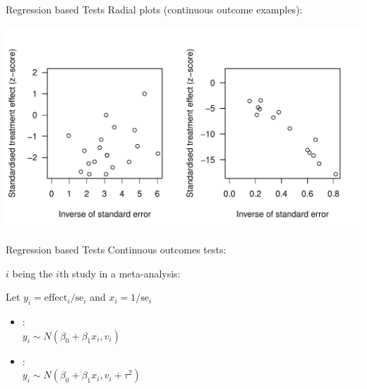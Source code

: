 \documentclass[english]{beamer}\usepackage[]{graphicx}\usepackage[]{color}
\makeatletter
\def\maxwidth{ %
  \ifdim\Gin@nat@width>\linewidth
    \linewidth
  \else
    \Gin@nat@width
  \fi
}
\newenvironment{knitrout}{}{} %
\makeatother
\begin{document}
\begin{frame}[fragile]{Regression based Tests}
Radial plots (continuous outcome examples):

\vspace{-1.2cm}

\begin{knitrout}
\color{fgcolor}
\includegraphics[width=\maxwidth]{figure/unnamed-chunk-7-1} 

\end{knitrout}

\end{frame}


\begin{frame}{Regression based Tests}
Continuous outcomes tests:

$i$ being the $i$th study in a meta-analysis:

Let $y_{i} = \textrm{effect}_{i}/\textrm{se}_{i}$ and $x_{i} = 1/\textrm{se}_{i}$
\begin{itemize}
\item \citet{Egger} : \\ $y_{i} \sim N(\beta_{0} + \beta_{1}x_{i}, v_{i})$
\item \citet{thompson.sharp} : \\ $y_{i} \sim N(\beta_{0} + \beta_{1}x_{i}, v_{i} + \tau^2)$
\end{itemize}
\end{frame}
\end{document}
